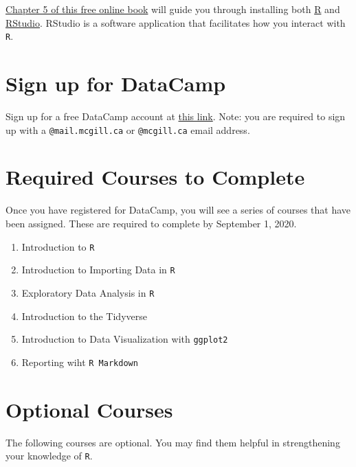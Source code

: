 \documentclass[letterpaper,12pt,twoside,]{pinp}
\providecommand{\tightlist}{%
  \setlength{\itemsep}{0pt}\setlength{\parskip}{0pt}}
\begin{document}
\href{https://datascienceineducation.com/c05.html}{Chapter 5 of this
free online book} will guide you through installing both
\href{https://cran.r-project.org/}{R} and
\href{https://www.rstudio.com/products/rstudio/download/preview/}{RStudio}.
RStudio is a software application that facilitates how you interact with
\texttt{R}.

\hypertarget{sign-up-for-datacamp}{%
\section{Sign up for DataCamp}\label{sign-up-for-datacamp}}

Sign up for a free DataCamp account at
\href{https://datacamp.com/groups/shared_links/779fb8c2bb178eb6936c93109a0efa66ad3a3519a4657ac1b5f70be80fa87718}{this
link}. Note: you are required to sign up with a \texttt{@mail.mcgill.ca}
or \texttt{@mcgill.ca} email address.

\hypertarget{required-courses-to-complete}{%
\section{Required Courses to
Complete}\label{required-courses-to-complete}}

Once you have registered for DataCamp, you will see a series of courses
that have been assigned. These are required to complete by September 1,
2020.

\begin{enumerate}
\def\labelenumi{\arabic{enumi}.}
\tightlist
\item
  Introduction to \texttt{R}
\item
  Introduction to Importing Data in \texttt{R}
\item
  Exploratory Data Analysis in \texttt{R}
\item
  Introduction to the Tidyverse
\item
  Introduction to Data Visualization with \texttt{ggplot2}
\item
  Reporting wiht \texttt{R\ Markdown}
\end{enumerate}

\hypertarget{optional-courses}{%
\section{Optional Courses}\label{optional-courses}}

The following courses are optional. You may find them helpful in
strengthening your knowledge of \texttt{R}.
\end{document}
